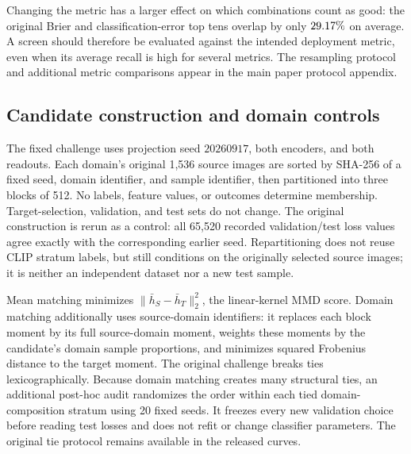 \documentclass{article}
\begin{document}
Changing the metric has a larger effect on which combinations count as good: the original Brier and classification-error top tens overlap by only $29.17\%$ on average. A screen should therefore be evaluated against the intended deployment metric, even when its average recall is high for several metrics. The resampling protocol and additional metric comparisons appear in the main paper protocol appendix.

\subsection{Candidate construction and domain controls}
\label{app:construction}
The fixed challenge uses projection seed $20260917$, both encoders, and both readouts. Each domain's original 1,536 source images are sorted by SHA-256 of a fixed seed, domain identifier, and sample identifier, then partitioned into three blocks of 512. No labels, feature values, or outcomes determine membership. Target-selection, validation, and test sets do not change. The original construction is rerun as a control: all 65,520 recorded validation/test loss values agree exactly with the corresponding earlier seed. Repartitioning does not reuse CLIP stratum labels, but still conditions on the originally selected source images; it is neither an independent dataset nor a new test sample.

Mean matching minimizes $\|\bar h_S-\bar h_T\|_2^2$, the linear-kernel MMD score. Domain matching additionally uses source-domain identifiers: it replaces each block moment by its full source-domain moment, weights these moments by the candidate's domain sample proportions, and minimizes squared Frobenius distance to the target moment. The original challenge breaks ties lexicographically. Because domain matching creates many structural ties, an additional post-hoc audit randomizes the order within each tied domain-composition stratum using 20 fixed seeds. It freezes every new validation choice before reading test losses and does not refit or change classifier parameters. The original tie protocol remains available in the released curves.

\begin{table}[ht]
\centering
\caption{The construction challenge uses logistic Brier. Final loss is validation-selected at $s=50$. The last columns measure retention of one empirical optimum when half of each non-singleton domain-composition stratum is kept, not final selection accuracy. Means average strata and encoders within targets, then six targets. Domain matching uses 20 randomized tie orders for final loss; its within-stratum entry is the exact uniform-tie expectation.}
\label{app:construction-table}

\end{table}
\end{document}
